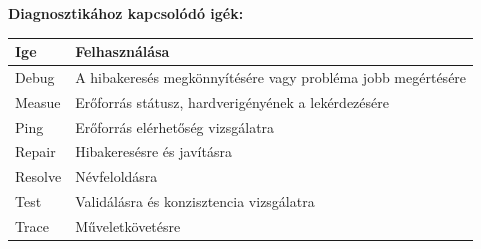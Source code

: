 \documentclass[12pt,oneside,justify,table]{book}
\begin{document}
\begin{appendices}
\noindent \textbf{Diagnosztikához kapcsolódó igék:} \cite{VerbsDiagnostic}\\
\begin{tabularx}{\linewidth}{l|X}
\rowcolor{blue!50}
\textbf{Ige} & \textbf{Felhasználása} \\
\hline
Debug & A hibakeresés megkönnyítésére vagy probléma jobb megértésére \\
Measue & Erőforrás státusz, hardverigényének a lekérdezésére \\
Ping & Erőforrás elérhetőség vizsgálatra \\
Repair & Hibakeresésre és javításra \\
Resolve & Névfeloldásra \\
Test & Validálásra és konzisztencia vizsgálatra \\
Trace & Műveletkövetésre \\
\end{tabularx}
\break

\end{appendices}
\end{document}
